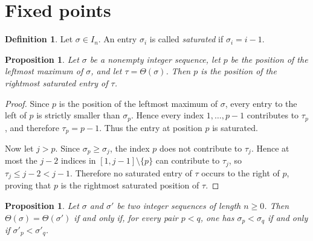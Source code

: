 \documentclass[11pt]{article}
\newtheorem{prop}[thm]{Proposition}
\theoremstyle{remark}
\theoremstyle{definition}
\newtheorem{defn}[thm]{Definition}
\begin{document}
\section{Fixed points}\label{sec:fixedpoints}

\begin{defn}
Let $\sigma\in I_n$. An entry $\sigma_i$ is called \emph{saturated} if $\sigma_i=i-1$.
\end{defn}

\begin{prop}\label{prop:image_leftmax_saturated}
Let $\sigma$ be a nonempty integer sequence, let $p$ be the position of the leftmost maximum of $\sigma$, and let $\tau=\Theta(\sigma)$. Then $p$ is the position of the rightmost saturated entry of $\tau$.
\end{prop}

\begin{proof}
Since $p$ is the position of the leftmost maximum of $\sigma$, every entry to the left of $p$ is strictly smaller than $\sigma_p$. Hence every index $1,\ldots,p-1$ contributes to $\tau_p$, and therefore $\tau_p=p-1$. Thus the entry at position $p$ is saturated.

Now let $j>p$. Since $\sigma_p\geq\sigma_j$, the index $p$ does not contribute to $\tau_j$. Hence at most the $j-2$ indices in $[1,j-1]\setminus\{p\}$ can contribute to $\tau_j$, so $\tau_j\leq j-2<j-1$. Therefore no saturated entry of $\tau$ occurs to the right of $p$, proving that $p$ is the rightmost saturated position of $\tau$.
\end{proof}

\begin{prop}\label{prop:preimage_characterization}
Let $\sigma$ and $\sigma'$ be two integer sequences of length $n \geq 0$. Then $\Theta(\sigma)=\Theta(\sigma')$ if and only if,
for every pair $p<q$, one has $\sigma_p<\sigma_q$ if and only if
$\sigma'_p<\sigma'_q$.
\end{prop}
\end{document}
